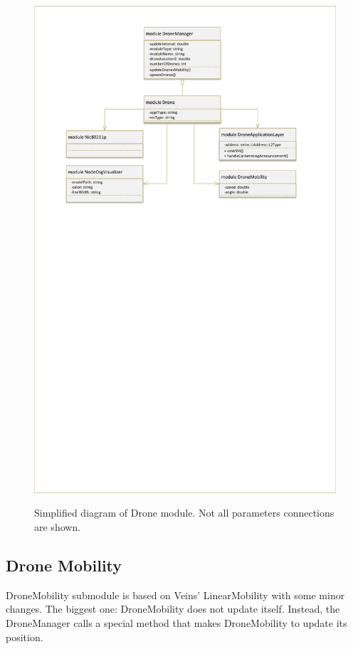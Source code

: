 \documentclass[]{nsm-thesis}
\begin{document}
\begin{figure}
  	\caption{Simplified diagram of Drone module. Not all parameters connections are shown.}
	\centering
	\includegraphics[width=1\textwidth]{figures/Drone.pdf}
	\label{fig:dronened}
\end{figure}

\subsection{Drone Mobility}

DroneMobility submodule is based on Veins' LinearMobility with some minor changes. The biggest one: DroneMobility does not update itself. Instead, the DroneManager calls a special method that makes DroneMobility to update its position.
\end{document}
